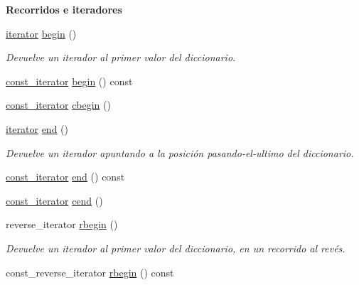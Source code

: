 \begin{Indent}{\bf \-Recorridos e iteradores}\par
\begin{DoxyCompactItemize}
\item 
\hyperlink{classaed2_1_1map_1_1iterator}{iterator} \hyperlink{classaed2_1_1map_a58a95705d54b3dda7f775ce5a22225cb_a58a95705d54b3dda7f775ce5a22225cb}{begin} ()
\begin{DoxyCompactList}\small\item\em \-Devuelve un iterador al primer valor del diccionario. \end{DoxyCompactList}\item 
\hyperlink{classaed2_1_1map_1_1const__iterator}{const\-\_\-iterator} \hyperlink{classaed2_1_1map_a1d10432d305bcb5f1af6ab7b75c27c1c_a1d10432d305bcb5f1af6ab7b75c27c1c}{begin} () const 
\item 
\hyperlink{classaed2_1_1map_1_1const__iterator}{const\-\_\-iterator} \hyperlink{classaed2_1_1map_ab96ad892caa28f193481a578f4956a2a_ab96ad892caa28f193481a578f4956a2a}{cbegin} ()
\item 
\hyperlink{classaed2_1_1map_1_1iterator}{iterator} \hyperlink{classaed2_1_1map_a76023e6a56cb625513e1b5ea028bf983_a76023e6a56cb625513e1b5ea028bf983}{end} ()
\begin{DoxyCompactList}\small\item\em \-Devuelve un iterador apuntando a la posición pasando-\/el-\/ultimo del diccionario. \end{DoxyCompactList}\item 
\hyperlink{classaed2_1_1map_1_1const__iterator}{const\-\_\-iterator} \hyperlink{classaed2_1_1map_a1f847ad4fd46883ac60d764967172179_a1f847ad4fd46883ac60d764967172179}{end} () const 
\item 
\hyperlink{classaed2_1_1map_1_1const__iterator}{const\-\_\-iterator} \hyperlink{classaed2_1_1map_a7bb91e94cbc875f1a011b142ef877912_a7bb91e94cbc875f1a011b142ef877912}{cend} ()
\item 
reverse\-\_\-iterator \hyperlink{classaed2_1_1map_ac412d3902112122c1bffe2d4283a4e9d_ac412d3902112122c1bffe2d4283a4e9d}{rbegin} ()
\begin{DoxyCompactList}\small\item\em \-Devuelve un iterador al primer valor del diccionario, en un recorrido al revés. \end{DoxyCompactList}\item 
const\-\_\-reverse\-\_\-iterator \hyperlink{classaed2_1_1map_aa68b6888ae3e256203d4ef273c293586_aa68b6888ae3e256203d4ef273c293586}{rbegin} () const 

\end{DoxyCompactItemize}
\end{Indent}
